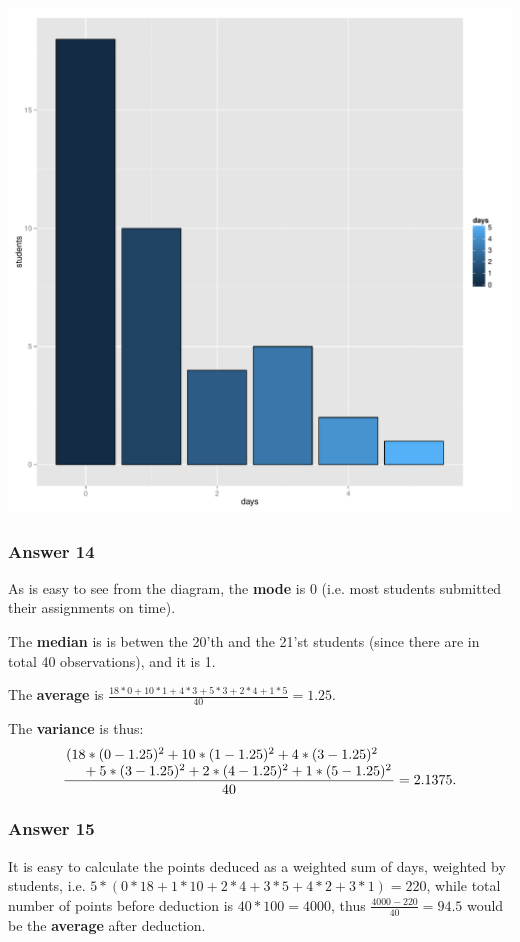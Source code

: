 \documentclass[11pt]{article}
\begin{document}
\includegraphics[width=.9\linewidth]{images/overdue.pdf}
\subsubsection{Answer 14}
\label{sec-1-4-2}
As is easy to see from the diagram, the \textbf{mode} is 0 (i.e. most students
submitted their assignments on time).

The \textbf{median} is is betwen the 20'th and the 21'st students (since there are
in total 40 observations), and it is 1.

The \textbf{average} is $\frac{18*0+10*1+4*3+5*3+2*4+1*5}{40}=1.25$.

The \textbf{variance} is thus:
\begin{equation*}
  \frac{\splitfrac{(18 * (0 - 1.25)^2 + 10 * (1 - 1.25)^2 + 4 * (3 - 1.25)^2}
    {+ 5 * (3 - 1.25)^2 + 2 * (4 - 1.25)^2 + 1 * (5 - 1.25)^2}}{40} = 2.1375.
\end{equation*}
\subsubsection{Answer 15}
\label{sec-1-4-3}
It is easy to calculate the points deduced as a weighted sum of days, weighted
by students, i.e. $5*(0*18+1*10+2*4+3*5+4*2+3*1)=220$, while total number of
points before deduction is $40*100=4000$, thus $\frac{4000-220}{40}=94.5$
would be the \textbf{average} after deduction.
\end{document}
